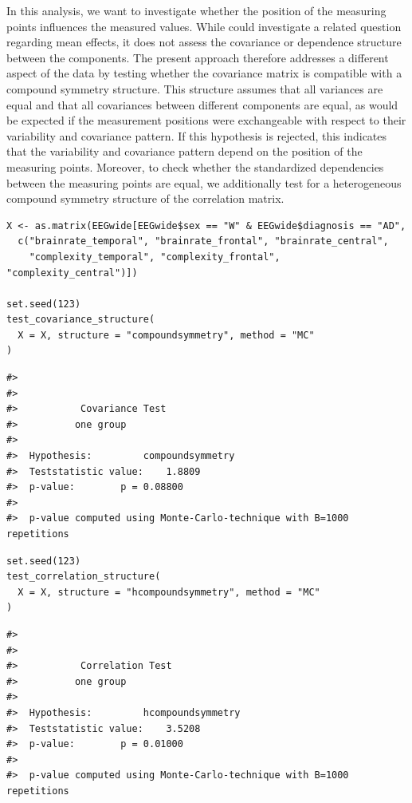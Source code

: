 In this analysis, we want to investigate whether the position of the measuring
points influences the measured values. While  could
investigate a related question regarding mean effects, it does not assess the
covariance or dependence structure between the components. The present approach
therefore addresses a different aspect of the data by testing whether the
covariance matrix is compatible with a compound symmetry structure. This
structure assumes that all variances are equal and that all covariances between
different components are equal, as would be expected if the measurement
positions were exchangeable with respect to their variability and covariance
pattern. If this hypothesis is rejected, this indicates that the variability and
covariance pattern depend on the position of the measuring points. Moreover, to
check whether the standardized dependencies between the measuring points are
equal, we additionally test for a heterogeneous compound symmetry structure of
the correlation matrix.

\begin{verbatim}
X <- as.matrix(EEGwide[EEGwide$sex == "W" & EEGwide$diagnosis == "AD",
  c("brainrate_temporal", "brainrate_frontal", "brainrate_central",
    "complexity_temporal", "complexity_frontal", "complexity_central")])

set.seed(123)
test_covariance_structure(
  X = X, structure = "compoundsymmetry", method = "MC"
)
\end{verbatim}

\begin{verbatim}
#> 
#> 
#>           Covariance Test 
#>          one group
#> 
#>  Hypothesis:         compoundsymmetry
#>  Teststatistic value:    1.8809
#>  p-value:        p = 0.08800
#>  
#>  p-value computed using Monte-Carlo-technique with B=1000 repetitions
\end{verbatim}

\begin{verbatim}
set.seed(123)
test_correlation_structure(
  X = X, structure = "hcompoundsymmetry", method = "MC"
)
\end{verbatim}

\begin{verbatim}
#> 
#> 
#>           Correlation Test 
#>          one group
#> 
#>  Hypothesis:         hcompoundsymmetry
#>  Teststatistic value:    3.5208
#>  p-value:        p = 0.01000
#>  
#>  p-value computed using Monte-Carlo-technique with B=1000 repetitions
\end{verbatim}

